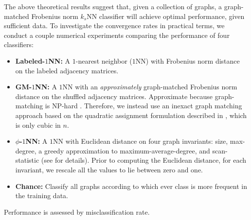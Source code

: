 \documentclass[10pt,journal,cspaper,compsoc]{IEEEtran}
\begin{document}
The above theoretical results suggest that, given a collection of graphs, a graph-matched Frobenius norm $k_s$NN classifier will achieve optimal performance, given sufficient data.  To investigate the convergence rates in practical terms, we conduct a couple numerical experiments comparing the performance of four classifiers:
\begin{itemize}
	\item \textbf{Labeled-$1$NN:}  A $1$-nearest neighbor ($1$NN) with Frobenius norm distance on the labeled adjacency matrices.
	\item \textbf{GM-$1$NN:} A $1$NN with an \emph{approximately} graph-matched Frobenius norm distance on the shuffled adjacency matrices.  Approximate because graph-matching is NP-hard \cite{Garey1979}.  Therefore, we instead use an inexact graph matching approach based on the quadratic assignment formulation described in \cite{VP11_QAP}, which is only cubic in $n$.
	\item \textbf{$\phi$-$1$NN:} A $1$NN with Euclidean distance on four graph invariants:  size, max-degree, a greedy approximation to maximum-average-degree, and scan-statistic (see \cite{PCP10} for details).   Prior to computing the Euclidean distance, for each invariant, we rescale all the values to lie between zero and one.
	\item \textbf{Chance:} Classify all graphs according to which ever class is more frequent in the training data.
\end{itemize}
Performance is assessed by misclassification rate.

% 
% 
% 
\end{document}
